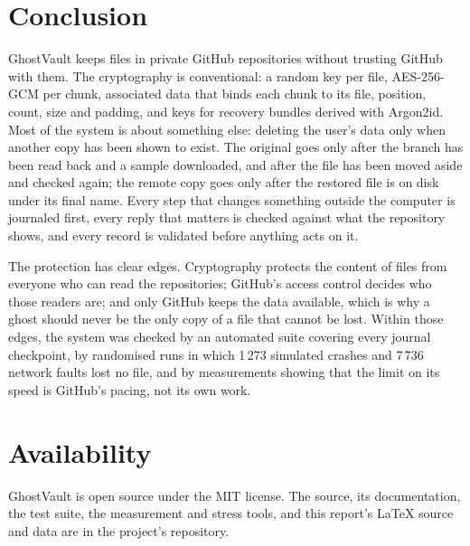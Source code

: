 \section{Conclusion}\label{sec:conclusion}

GhostVault keeps files in private GitHub repositories without trusting GitHub with them. The
cryptography is conventional: a random key per file, AES-256-GCM per chunk, associated data that binds
each chunk to its file, position, count, size and padding, and keys for recovery bundles derived with
Argon2id. Most of the system is about something else: deleting the user's data only when another copy
has been shown to exist. The original goes only after the branch has been read back and a sample
downloaded, and after the file has been moved aside and checked again; the remote copy goes only after
the restored file is on disk under its final name. Every step that changes something outside the
computer is journaled first, every reply that matters is checked against what the repository shows,
and every record is validated before anything acts on it.

The protection has clear edges. Cryptography protects the content of files from everyone who can read
the repositories; GitHub's access control decides who those readers are; and only GitHub keeps the data
available, which is why a ghost should never be the only copy of a file that cannot be lost. Within
those edges, the system was checked by an automated suite covering every journal checkpoint, by
randomised runs in which 1\,273 simulated crashes and 7\,736 network faults lost no file, and by
measurements showing that the limit on its speed is GitHub's pacing, not its own work.

\section*{Availability}
GhostVault is open source under the MIT license. The source, its documentation, the test suite, the
measurement and stress tools, and this report's \LaTeX{} source and data are in the project's
repository.
